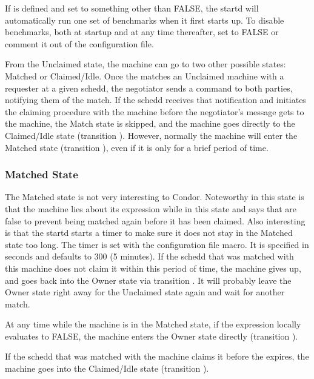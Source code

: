\Note If  is defined and set to something
other than FALSE, the startd will automatically run one set of
benchmarks when it first starts up.
To disable benchmarks, both at startup and at any time thereafter,
set  to FALSE or comment it out of the
configuration file.

From the Unclaimed state, the machine can go to two other possible
states: Matched or Claimed/Idle.
Once the  matches an Unclaimed machine with a
requester at a given schedd, the negotiator sends a command to both
parties, notifying them of the match.  
If the schedd receives that notification and initiates the claiming
procedure with the machine before the negotiator's message gets to the
machine, the Match state is skipped,
and the machine goes
directly to the Claimed/Idle state (transition ).
However, normally the machine will enter the Matched state (transition
), even if it is only for a brief period of time.

\subsubsection{\label{sec:Matched-State}Matched State}

The Matched state is not very interesting to Condor.
Noteworthy in this state is that the machine lies about its 
expression while in this state and says that  are
false to prevent being matched again before it has been claimed.
Also interesting is that
the startd starts a timer to make sure it does not stay in the
Matched state too long.
The timer is set with the 
\label{param:MatchTimeout} configuration file macro.
It is specified in seconds and defaults to 300 (5 minutes).
If the schedd that was matched with this machine does not
claim it within this period of time, the machine gives up,
and goes back into the Owner state via transition .
It will probably leave the Owner state right away for the
Unclaimed state again and wait for another match. 

At any time while the machine is in the Matched state, if the
 expression locally evaluates to FALSE, the machine enters
the Owner state directly (transition ).

If the schedd that was matched with the machine claims it before the
 expires, the machine goes into the Claimed/Idle
state (transition ).

